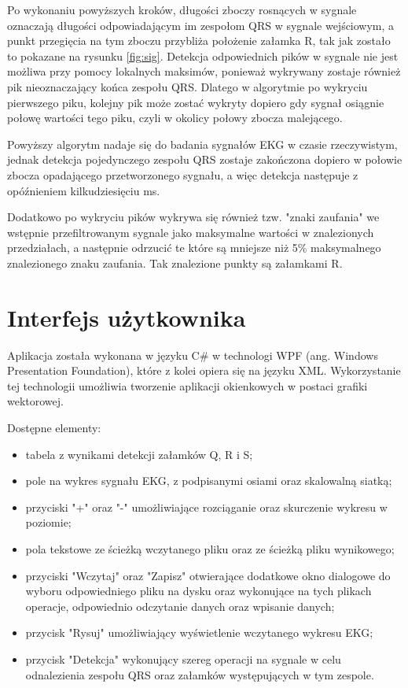 \documentclass[11pt]{report}
\begin{document}
	Po wykonaniu powyższych kroków, długości zboczy rosnących w sygnale oznaczają długości odpowiadającym im zespołom QRS w sygnale wejściowym, a punkt przegięcia na tym zboczu przybliża położenie załamka R, tak jak zostało to pokazane na rysunku \ref{fig:sig}. Detekcja odpowiednich pików w sygnale nie jest możliwa przy pomocy lokalnych maksimów, ponieważ wykrywany zostaje również pik nieoznaczający końca zespołu QRS. Dlatego w algorytmie po wykryciu pierwszego piku, kolejny pik może zostać wykryty dopiero gdy sygnał osiągnie połowę wartości tego piku, czyli w  okolicy połowy zbocza malejącego.
	
	Powyższy algorytm nadaje się do badania sygnałów EKG w czasie rzeczywistym, jednak detekcja pojedynczego zespołu QRS zostaje zakończona dopiero w połowie zbocza opadającego przetworzonego sygnału, a więc detekcja następuje z opóźnieniem kilkudziesięciu ms.
	
	Dodatkowo po wykryciu pików wykrywa się również tzw. "znaki zaufania" we wstępnie przefiltrowanym sygnale jako maksymalne wartości w znalezionych przedziałach, a następnie odrzucić te które są mniejsze niż 5\% maksymalnego znalezionego znaku zaufania. Tak znalezione punkty są załamkami R.
	
	\chapter{Interfejs użytkownika}
	Aplikacja została wykonana w języku C\# w technologi WPF (ang. Windows Presentation Foundation), które z kolei opiera się na języku XML. Wykorzystanie tej technologii umożliwia tworzenie aplikacji okienkowych w postaci grafiki wektorowej.\newline
	
	Dostępne elementy:
	\begin{itemize}
		\item tabela z wynikami detekcji załamków Q, R i S;
		\item pole na wykres sygnału EKG, z podpisanymi osiami oraz skalowalną siatką;
		\item przyciski "+" oraz "-" umożliwiające rozciąganie oraz skurczenie wykresu w poziomie;
		\item pola tekstowe ze ścieżką wczytanego pliku oraz ze ścieżką pliku wynikowego;
		\item przyciski "Wczytaj" oraz "Zapisz" otwierające dodatkowe okno dialogowe do wyboru odpowiedniego pliku na dysku oraz wykonujące na tych plikach operacje, odpowiednio odczytanie danych oraz wpisanie danych;
		\item przycisk "Rysuj" umożliwiający wyświetlenie wczytanego wykresu EKG;
		\item przycisk "Detekcja" wykonujący szereg operacji na sygnale w celu odnalezienia zespołu QRS oraz załamków występujących w tym zespole.
	\end{itemize}
	
\end{document}
